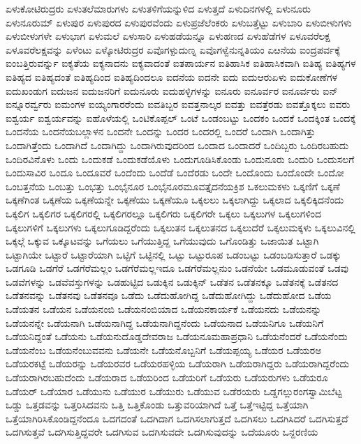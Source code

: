 {ಏಳುಕೋಟಿರುದ್ರರು
ಏಳುತಲೆಮಾರುಗಳು
ಏಳುತಳಿಗೆಯನ್ನುಳಿದ
ಏಳುತ್ತದೆ
ಏಳುದಿನಗಳಲ್ಲಿ
ಏಳುನೂರು
ಏಳುನೂರುಮ್
ಏಳುಪುರ
ಏಳುಪುರದ
ಏಳುಪುರವೆಂದು
ಏಳುಪ್ರಜೆಲೆಂಕರು
ಏಳುಬತ್ತೆಟ್ಟು
ಏಳುಬಾರಿ
ಏಳುಬೀಳುಗಳು
ಏಳುಬೀಳುಗಳೇ
ಏಳುಭಾಗ
ಏಳುಮಲೆ
ಏಳುಸಾರಿ
ಏಳುಹಡೆಯನ್ನೂ
ಏಳುಹಣದ
ಏಳುಹೆಡೆಗಳ
ಏಳೂವರೆಲಕ್ಷ
ಏಳೂವರೆಲಕ್ಷವನ್ನು
ಏಳೆಂಟು
ಏಳ್ಕೋಟಿರುದ್ರರ
ಏವೊಗಳ್ಪುದುಣ್ನ
ಏವೊಗಳ್ವೆನುನ್ನತಿಯಂ
ಏೞನೆಯ
ಐಂದ್ರಪರ್ವಕ್ಕೆ
ಐಂಬತ್ತಿರುವರ್ನ್ನು
ಐಕ್ಯತೆಯ
ಐಕ್ಯನಾದನು
ಐಕ್ಯವಾದಂತೆ
ಐತಪಾರ್ಯನ
ಐತಿಹಾಸಿಕ
ಐತಿಹಾಸಿಕವಾಗಿ
ಐತಿಹ್ಯ
ಐತಿಹ್ಯಗಳ
ಐತಿಹ್ಯದ
ಐತಿಹ್ಯದಂತೆ
ಐತಿಹ್ಯದಿಂದ
ಐತಿಹ್ಯದಿಂದಲೂ
ಐದನೆಯ
ಐದನೇ
ಐದು
ಐದುಆರುಏಳು
ಐದುಕೋಣೆಗಳ
ಐದುಖಂಡುಗ
ಐದುಜನ
ಐದುಜನರಿಗೆ
ಐದುನೂರು
ಐದುಹಳ್ಳಿಗಳನ್ನು
ಐನೂರು
ಐನೂರ್ವರ
ಐನೂರ್ವರು
ಐನ್
ಐನ್ನೂರರ್ವ್ವರು
ಐಮಂಗಳ
ಐಯ್ಯಂಗಾರರೆಂದು
ಐವತಿಬ್ಬರ
ಐವತ್ತನಾಲ್ಕರ
ಐವತ್ತು
ಐವತ್ತೆರಡು
ಐವತ್ತೊಕ್ಕಲು
ಐವರು
ಐಶ್ವರ್ಯ
ಐಶ್ವರ್ಯವನ್ನು
ಐಹೊಳೆಯಲ್ಲಿ
ಒಂಟಿಕೊಪ್ಪಲ್
ಒಂಟೆ
ಒಂಡಂಬಟ್ಟು
ಒಂದಕಂ
ಒಂದಕೆ
ಒಂದಕ್ಕಿಂತ
ಒಂದಕ್ಕೆ
ಒಂದನೆಯ
ಒಂದನೆಯಬಲ್ಲಾಳನ
ಒಂದನೇ
ಒಂದನ್ನು
ಒಂದರ
ಒಂದರಲ್ಲಿ
ಒಂದರೆ
ಒಂದಾಗಿ
ಒಂದಾಗಿತ್ತು
ಒಂದಾಗಿತ್ತೆಂದು
ಒಂದಾಗಿದೆ
ಒಂದಾಗಿದ್ದು
ಒಂದಾಗಿರುವುದರಿಂದ
ಒಂದಾದ
ಒಂದಾದರೆ
ಒಂದಿಬ್ಬರು
ಒಂದಿರಬಹುದು
ಒಂದಿರವಿನೊಳು
ಒಂದು
ಒಂದುಕಡೆ
ಒಂದುಕಡೆಯೊಳು
ಒಂದುಗೂಡಿಸಿಕೊಂಡು
ಒಂದುನೂರು
ಒಂದುರಿ
ಒಂದುಸಲಗೆ
ಒಂದುಸಾವಿರ
ಒಂದೂ
ಒಂದೂವರೆ
ಒಂದೆಂದು
ಒಂದೆಡೆ
ಒಂದೆರಡು
ಒಂದೇ
ಒಂದೊಂದು
ಒಂದೊಂದೇ
ಒಂದೋ
ಒಂಬತ್ತನೆಯ
ಒಂಬತ್ತು
ಒಂಭತ್ತು
ಒಂಭೈನೂರ
ಒಂಭೈನೂರಮೂವತ್ತೈದನೆಯಕ್ರಿಶ
ಒಕಲುಮಕಳು
ಒಕ್ಕಣಿಗೆ
ಒಕ್ಕಣೆ
ಒಕ್ಕಣೆಗಿಂತ
ಒಕ್ಕಣೆಯ
ಒಕ್ಕಣೆಯನ್ನೇ
ಒಕ್ಕಣೆಯು
ಒಕ್ಕಣೆಯೂ
ಒಕ್ಕಲಲು
ಒಕ್ಕಲಾಗಿದ್ದು
ಒಕ್ಕಲಾದ
ಒಕ್ಕಲಿಕ್ಕಿದನೆಂದು
ಒಕ್ಕಲಿಗ
ಒಕ್ಕಲಿಗರ
ಒಕ್ಕಲಿಗರಲ್ಲಿ
ಒಕ್ಕಲಿಗರಲ್ಲೂ
ಒಕ್ಕಲಿಗರು
ಒಕ್ಕಲಿಗರೇ
ಒಕ್ಕಲು
ಒಕ್ಕಲುಗಳ
ಒಕ್ಕಲುಗಳಿಂದ
ಒಕ್ಕಲುಗಳಿಗೆ
ಒಕ್ಕಲುಗಳು
ಒಕ್ಕಲುಗೂಡಿದ್ದರೆಂದು
ಒಕ್ಕಲುತನ
ಒಕ್ಕಲುತನದ
ಒಕ್ಕಲುದೆರೆ
ಒಕ್ಕಲುಮಕ್ಕಳು
ಒಕ್ಕಲುವಿನಲ್ಲಿ
ಒಕ್ಕಲ್ಗೆ
ಒಕ್ಕುವ
ಒಕ್ಕೂಟವನ್ನು
ಒಗೆಯಲು
ಒಗೆಯುತ್ತಿದ್ದ
ಒಗೆಯುವುದು
ಒಗೊಂಡಿತ್ತು
ಒಜಾಯಿತ
ಒಟ್ಟಾಗಿ
ಒಟ್ಟಾಗಿಯೇ
ಒಟ್ಟಾರೆ
ಒಟ್ಟಾರೆಯಾಗಿ
ಒಟ್ಟಿಗೆ
ಒಟ್ಟಿನಲ್ಲಿ
ಒಟ್ಟು
ಒಟ್ಟುರೂಪ
ಒಡಂಬಟ್ಟು
ಒಡಂಬಡಿಸುತ್ತಾರೆ
ಒಡಕ್ಕು
ಒಡಗೂಡಿ
ಒಡಗೆರೆ
ಒಡಗೆರೆಮಲ್ಲಂ
ಒಡಗೆರೆಮಲ್ಲಇದೂ
ಒಡಗೆರೆಮಲ್ಲನುಂ
ಒಡನೆಯೇ
ಒಡಮೂಡುವಂತೆ
ಒಡವು
ಒಡವೆಗಳನ್ನು
ಒಡವೆವಸ್ತುಗಳನ್ನು
ಒಡಹುಟ್ಟಿದ
ಒಡುಕ್ಕಿನ
ಒಡುಕ್ಕಿನ್
ಒಡೆತನ
ಒಡೆತನಕ್ಕೂ
ಒಡೆತನಕ್ಕೆ
ಒಡೆತನದ
ಒಡೆತನವನ್ನು
ಒಡೆತನವು
ಒಡೆತನವೂ
ಒಡೆದು
ಒಡೆದುಹೋಗಿದ್ದ
ಒಡೆದುಹೋಗಿದ್ದು
ಒಡೆದುಹೋದ
ಒಡೆಯ
ಒಡೆಯತನ
ಒಡೆಯನ
ಒಡೆಯನಂಬಿ
ಒಡೆಯನಂಬಿಯಾದ
ಒಡೆಯನಕಾರ್ಯಕೆ
ಒಡೆಯನದು
ಒಡೆಯನನ್ನು
ಒಡೆಯನನ್ನೇ
ಒಡೆಯನಾಗಿ
ಒಡೆಯನಾಗಿದ್ದ
ಒಡೆಯನಾಗಿದ್ದನೆಂದು
ಒಡೆಯನಾದ
ಒಡೆಯನಿಗೂ
ಒಡೆಯನಿಗೆ
ಒಡೆಯನಿದ್ದಂತೆ
ಒಡೆಯನು
ಒಡೆಯನುದೊಡ್ಡದೇವರಾಜ
ಒಡೆಯನೂಮಹಾಪ್ರಧಾನಿ
ಒಡೆಯನೆಂದರೆ
ಒಡೆಯನೆಂದು
ಒಡೆಯನೆಂಬ
ಒಡೆಯನೆಂಬುವವನು
ಒಡೆಯನೇ
ಒಡೆಯನೊಬ್ಬನಿಗೆ
ಒಡೆಯಪ್ಪಯ್ಯ
ಒಡೆಯರ
ಒಡೆಯರಅ
ಒಡೆಯರಕಟ್ಟೆ
ಒಡೆಯರನ್ನು
ಒಡೆಯರವರ
ಒಡೆಯರಹಳ್ಳಿಯ
ಒಡೆಯರಾಗಿ
ಒಡೆಯರಾಗಿದ್ದರು
ಒಡೆಯರಾಗಿದ್ದರೆಂದು
ಒಡೆಯರಾಗಿರಬಹುದೆಂದು
ಒಡೆಯರಾದ
ಒಡೆಯರಿಂದ
ಒಡೆಯರಿಗೆ
ಒಡೆಯರು
ಒಡೆಯರುಗಳು
ಒಡೆಯರೂ
ಒಡೆಯರ್
ಒಡೆಯಾರ
ಒಡೆಯುನು
ಒಡೆಯುರ
ಒಡೆಯುರು
ಒಡೆಯುವ
ಒಡೆರಯರು
ಒಡ್ಡಗಲ್ಲುರಂಗಸ್ವಾಮಿಬೆಟ್ಟ
ಒಡ್ಡು
ಒತ್ತಡವನ್ನು
ಒತ್ತರಿಸಿದವನು
ಒತ್ತಿ
ಒತ್ತಿಕೊಂಡು
ಒತ್ತುವರಿಯಾಗಿದೆ
ಒತ್ತೆ
ಒತ್ತೆಇಟ್ಟಿದ್ದ
ಒತ್ತೆಯಾಗಿ
ಒತ್ತೆಯಾಗಿರಿಸಿಕೊಂಡಿದ್ದನೆಂದೂ
ಒದಗದಂತೆ
ಒದಗಿದಾಗ
ಒದಗಿಸಲಾಗುತ್ತದೆ
ಒದಗಿಸಲು
ಒದಗಿಸಿದರೆ
ಒದಗಿಸುತ್ತದೆ
ಒದಗಿಸುತ್ತವೆ
ಒದಗಿಸುತ್ತಿದ್ದವರೇ
ಒದಗಿಸುವ
ಒದಗಿಸುವದೇ
ಒದಗಿಸುವುದನ್ನು
ಒದೆಯೂರು
ಒನ್ದರಣಿಯ
}
